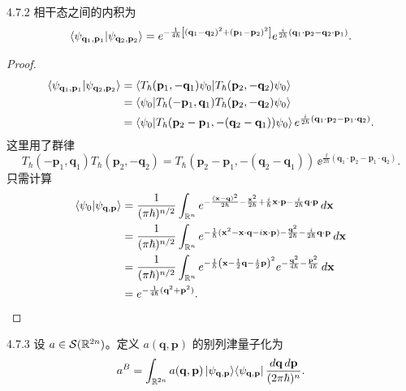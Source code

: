 \begin{proposition}{4.7.2}
  相干态之间的内积为
  \[
  \langle \psi_{\mathbf q_1,\mathbf p_1}|\psi_{\mathbf q_2,\mathbf p_2}\rangle
  =e^{-\frac{1}{4\hbar}\left[(\mathbf q_1-\mathbf q_2)^2
  +(\mathbf p_1-\mathbf p_2)^2\right]}
  e^{\frac{i}{2\hbar}(\mathbf q_1\cdot\mathbf p_2-\mathbf q_2\cdot\mathbf p_1)}.
  \]
\end{proposition}

\begin{proof}
\begin{align*}
\langle \psi_{\mathbf q_1,\mathbf p_1}|\psi_{\mathbf q_2,\mathbf p_2}\rangle
&=\langle T_{\hbar}(\mathbf p_1,-\mathbf q_1)\psi_0|T_{\hbar}(\mathbf p_2,-\mathbf q_2)\psi_0\rangle\\
&=\langle \psi_0|T_{\hbar}(-\mathbf p_1,\mathbf q_1)
T_{\hbar}(\mathbf p_2,-\mathbf q_2)\psi_0\rangle\\
&=\langle \psi_0|T_{\hbar}(\mathbf p_2-\mathbf p_1,
-(\mathbf q_2-\mathbf q_1))\psi_0\rangle\,
e^{\frac{i}{2\hbar}(\mathbf q_1\cdot\mathbf p_2-\mathbf p_1\cdot\mathbf q_2)}.
\end{align*}
这里用了群律
\[
T_{\hbar}(-\mathbf p_1,\mathbf q_1)T_{\hbar}(\mathbf p_2,-\mathbf q_2)
=T_{\hbar}(\mathbf p_2-\mathbf p_1,-(\mathbf q_2-\mathbf q_1))\,
\ee^{\frac{\ii}{2\hbar}(\mathbf q_1\cdot\mathbf p_2-\mathbf p_1\cdot\mathbf q_2)}.
\]
只需计算
\begin{align*}
\langle \psi_0|\psi_{\mathbf q,\mathbf p}\rangle
&=\frac{1}{(\pi\hbar)^{n/2}}\int_{\mathbb{R}^n}
e^{-\frac{(\mathbf x-\mathbf q)^2}{2\hbar}-\frac{\mathbf x^2}{2\hbar}
+\frac{i}{\hbar}\mathbf x\cdot\mathbf p-\frac{i}{2\hbar}\mathbf q\cdot\mathbf p}
\,d\mathbf x\\
&=\frac{1}{(\pi\hbar)^{n/2}}\int_{\mathbb{R}^n}
e^{-\frac{1}{\hbar}(\mathbf x^2-\mathbf x\cdot\mathbf q-i\mathbf x\cdot\mathbf p)
-\frac{\mathbf q^2}{2\hbar}-\frac{i}{2\hbar}\mathbf q\cdot\mathbf p}\,d\mathbf x\\
&=\frac{1}{(\pi\hbar)^{n/2}}\int_{\mathbb{R}^n}
e^{-\frac{1}{\hbar}\left(\mathbf x-\frac12\mathbf q-\frac{i}{2}\mathbf p\right)^2}
e^{-\frac{\mathbf q^2}{4\hbar}-\frac{\mathbf p^2}{4\hbar}}\,d\mathbf x\\
&=e^{-\frac{1}{4\hbar}(\mathbf q^2+\mathbf p^2)}.
\end{align*}
\end{proof}

\begin{definition}{4.7.3}
  设 $a\in\mathcal S(\mathbb{R}^{2n})$。定义 $a(\mathbf q,\mathbf p)$ 的别列津量子化为
  \[
  a^B=\int_{\mathbb{R}^{2n}}a(\mathbf q,\mathbf p)\,
  |\psi_{\mathbf q,\mathbf p}\rangle\langle \psi_{\mathbf q,\mathbf p}|\,
  \frac{d\mathbf q\,d\mathbf p}{(2\pi\hbar)^n}.
  \]
\end{definition}

